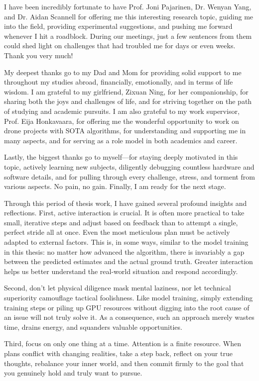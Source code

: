 \documentclass[english,12pt,a4paper,pdftex,elec,utf8]{aaltothesis}
\begin{document}
I have been incredibly fortunate to have Prof. Joni Pajarinen, Dr. Wenyan Yang, and Dr. Aidan Scannell for offering me this interesting research topic, guiding me into the field, providing experimental suggestions, and pushing me forward whenever I hit a roadblock. During our meetings, just a few sentences from them could shed light on challenges that had troubled me for days or even weeks. Thank you very much!

My deepest thanks go to my Dad and Mom for providing solid support to me throughout my studies abroad, financially, emotionally, and in terms of life wisdom. I am grateful to my girlfriend, Zixuan Ning, for her companionship, for sharing both the joys and challenges of life, and for striving together on the path of studying and academic pursuits. I am also grateful to my work supervisor, Prof. Eija Honkavaara, for offering me the wonderful opportunity to work on drone projects with SOTA algorithms, for understanding and supporting me in many aspects, and for serving as a role model in both academics and career.

Lastly, the biggest thanks go to myself—for staying deeply motivated in this topic, actively learning new subjects, diligently debugging countless hardware and software details, and for pulling through every challenge, stress, and torment from various aspects. No pain, no gain. Finally, I am ready for the next stage.

Through this period of thesis work, I have gained several profound insights and reflections. First, active interaction is crucial. It is often more practical to take small, iterative steps and adjust based on feedback than to attempt a single, perfect stride all at once. Even the most meticulous plan must be actively adapted to external factors. This is, in some ways, similar to the model training in this thesis: no matter how advanced the algorithm, there is invariably a gap between the predicted estimates and the actual ground truth. Greater interaction helps us better understand the real-world situation and respond accordingly.

Second, don't let physical diligence mask mental laziness, nor let technical superiority camouflage tactical foolishness. Like model training, simply extending training steps or piling up GPU resources without digging into the root cause of an issue will not truly solve it. As a consequence, such an approach merely wastes time, drains energy, and squanders valuable opportunities.

Third, focus on only one thing at a time. Attention is a finite resource. When plans conflict with changing realities, take a step back, reflect on your true thoughts, rebalance your inner world, and then commit firmly to the goal that you genuinely hold and truly want to pursue.
\end{document}
